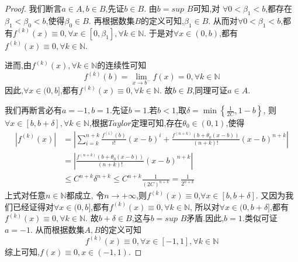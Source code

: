 \documentclass[lang=cn,newtx,10pt,scheme=chinese]{../Template/elegantbook}
\begin{document}
\begin{exercise}
\begin{proof}
        我们断言$a\in A,b\in B$,先证$b\in B$.
        由$b=sup\,\,B$可知,对
        $\forall 0<\beta_1<b$,都存在$\beta_1<\beta_0<b$,使得$\beta_0\in B$.
        再根据数集$B$的定义可知,$\beta_1\in B$.
        从而对$\forall 0<\beta_1<b$,都有$f^{\left( k \right)}\left( x \right) \equiv 0,\forall x\in \left[ 0,\beta_1 \right] ,\forall k\in \mathbb{N}$.
        于是对$\forall x\in(0,b)$,都有$f^{(k)}(x)\equiv0,\forall k\in \mathbb{N}$.

        进而,由$f^{(k)}(x),\forall k\in \mathbb{N}$的连续性可知
        \begin{equation}
            f^{\left( k \right)}\left( b \right) =\underset{x\rightarrow b^-}{\lim}f\left( x \right) =0,\forall k\in \mathbb{N}
            \nonumber
        \end{equation}
        因此,$\forall x\in(0,b]$,都有$f^{(k)}(x)\equiv0,\forall k\in\mathbb{N}$.
        故$b\in B$,同理可证$a\in A$.

        我们再断言必有$a=-1,b=1$.先证$b=1$.若$b<1$,取$\delta=\min \left\{ \frac{1}{2C},1-b \right\}$,
        则$\forall x\in[b,b+\delta],\forall k\in\mathbb{N}$,根据$Taylor$定理可知,存在$\theta_0\in(0,1)$,使得
        \begin{equation}
            \begin{split}
                \left| f^{\left( k \right)}\left( x \right) \right|&=\left| \sum_{i=k}^{n+k}{\frac{f^{\left( i \right)}\left( b \right)}{i!}\left( x-b \right) ^i}+\frac{f^{\left( n+k \right)}\left( b+\theta _0\left( x-b \right) \right)}{\left( n+k \right) !}\left( x-b \right) ^{n+k} \right|
\\
&=\left| \frac{f^{\left( n+k \right)}\left( b+\theta _0\left( x-b \right) \right)}{\left( n+k \right) !}\left( x-b \right) ^{n+k} \right|
\\
&\leqslant C^{n+k}\delta ^{n+k}\leqslant C^{n+k}\frac{1}{\left( 2C \right) ^{n+k}}=\frac{1}{2^{n+k}}
            \end{split}
            \nonumber
        \end{equation}
        上式对任意$n\in\mathbb{N}$都成立,
        令$n \to +\infty$,则$f^{(k)}(x)\equiv0$,$\forall x\in[b,b+\delta]$.
        又因为我们已经证得对$\forall x\in(0,b]$,都有$f^{(k)}(x)\equiv0,\forall k\in\mathbb{N}$,
        所以对$\forall x\in(0,b+\delta]$,都有$f^{(k)}(x)\equiv0,\forall k\in\mathbb{N}$.
        故$b+\delta \in B$,这与$b=sup\,\,B$矛盾.因此,$b=1$.类似可证$a=-1$.
        从而根据数集$A,B$的定义可知
        \begin{equation}
            f^{\left( k \right)}\left( x \right) \equiv 0,\forall x\in \left[ -1,1 \right] ,\forall k\in \mathbb{N} 
            \nonumber
        \end{equation}
        综上可知,$f(x)\equiv0,x\in(-1,1)$.
    
\end{proof}
\end{exercise}
\end{document}
